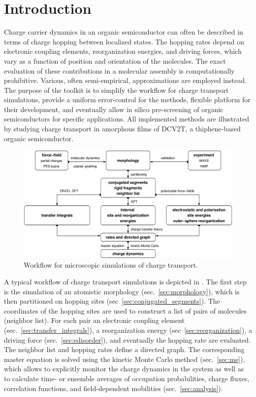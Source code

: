 \chapter{Introduction}
\label{sec:introduction}

Charge carrier dynamics in an organic semiconductor can often be described in terms of charge hopping between localized states. The hopping rates depend on electronic coupling elements, reorganization energies, and driving forces, which vary as a function of position and orientation of the molecules.  The exact evaluation of these contributions in a molecular assembly is computationally prohibitive. Various, often semi-empirical, approximations are employed instead. The purpose of the toolkit is to simplify the workflow for charge transport simulations, provide a uniform error-control for the methods, flexible platform for their development, and eventually allow in silico pre-screening of organic semiconductors for specific applications. All implemented methods are illustrated by studying charge transport in amorphous films of DCV2T, a thiphene-based organic semiconductor.

\begin{figure}[t]
\includegraphics[width=\linewidth]{fig/workflow/workflow}
 \caption{%
   Workflow for microscopic simulations of charge transport.  %
   \label{fig:workflow}}
\end{figure}

A typical workflow of charge transport simulations is depicted in . The first step is the simulation of an atomistic morphology (sec.~\ref{sec:morphology}), which is then partitioned on hopping sites (sec~\ref{sec:conjugated_segments}). The coordinates of the hopping sites are used to construct a list of pairs of molecules (neighbor list). For each pair an electronic coupling element (sec.~\ref{sec:transfer_integrals}), a reorganization energy (sec~\ref{sec:reorganization}), a driving force (sec.~\ref{sec:edisorder}), and eventually the hopping rate are evaluated. The neighbor list and hopping rates define a directed graph. The corresponding master equation is solved using the kinetic Monte Carlo method (sec.~\ref{sec:me}), which allows to explicitly monitor the charge dynamics in the system as well as to calculate time- or ensemble averages of occupation probabilities, charge fluxes, correlation functions, and field-dependent mobilities (sec.~\ref{sec:analysis}).
